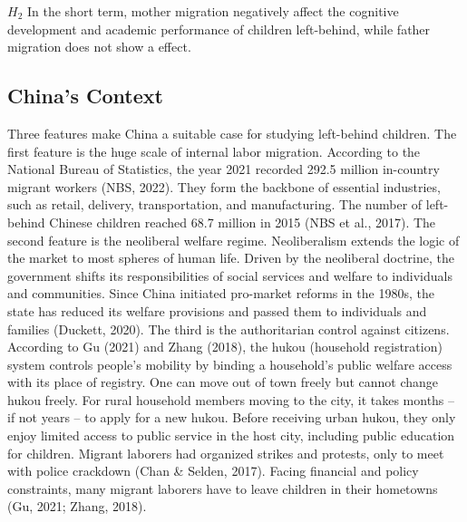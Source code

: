 \documentclass[
  man,floatsintext]{apa7}
\begin{document}
\(H_2\) In the short term, mother migration negatively affect the cognitive development and academic performance of children left-behind, while father migration does not show a effect.

\hypertarget{chinas-context}{%
\subsection{China's Context}\label{chinas-context}}

Three features make China a suitable case for studying left-behind children. The first feature is the huge scale of internal labor migration. According to the National Bureau of Statistics, the year 2021 recorded 292.5 million in-country migrant workers (NBS, 2022). They form the backbone of essential industries, such as retail, delivery, transportation, and manufacturing. The number of left-behind Chinese children reached 68.7 million in 2015 (NBS et al., 2017). The second feature is the neoliberal welfare regime. Neoliberalism extends the logic of the market to most spheres of human life. Driven by the neoliberal doctrine, the government shifts its responsibilities of social services and welfare to individuals and communities. Since China initiated pro-market reforms in the 1980s, the state has reduced its welfare provisions and passed them to individuals and families (Duckett, 2020). The third is the authoritarian control against citizens. According to Gu (2021) and Zhang (2018), the hukou (household registration) system controls people's mobility by binding a household's public welfare access with its place of registry. One can move out of town freely but cannot change hukou freely. For rural household members moving to the city, it takes months -- if not years -- to apply for a new hukou. Before receiving urban hukou, they only enjoy limited access to public service in the host city, including public education for children. Migrant laborers had organized strikes and protests, only to meet with police crackdown (Chan \& Selden, 2017). Facing financial and policy constraints, many migrant laborers have to leave children in their hometowns (Gu, 2021; Zhang, 2018).
\end{document}
